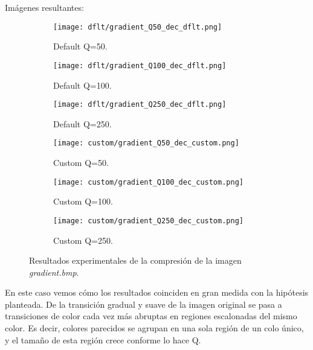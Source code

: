 \documentclass[12pt,a4paper]{article}
\begin{document}
Imágenes resultantes:
\begin{figure}[H]
    
    \begin{subfigure}{0.25\textwidth}
        \centering
        \texttt{[image: dflt/gradient\_Q50\_dec\_dflt.png]}
        \caption{Default Q=50.}
        
    \end{subfigure}
    \hfill
    \begin{subfigure}{0.25\textwidth}
        \centering
        \texttt{[image: dflt/gradient\_Q100\_dec\_dflt.png]}
        \caption{Default Q=100.}
        
    \end{subfigure}
    \hfill
    \begin{subfigure}{0.25\textwidth}
        \centering
        \texttt{[image: dflt/gradient\_Q250\_dec\_dflt.png]}
        \caption{Default Q=250.}
        
    \end{subfigure}
    
    \vspace{0.5cm}
    
    \begin{subfigure}{0.25\textwidth}
        \centering
        \texttt{[image: custom/gradient\_Q50\_dec\_custom.png]}
        \caption{Custom Q=50.}
        
    \end{subfigure}
    \hfill
    \begin{subfigure}{0.25\textwidth}
        \centering
        \texttt{[image: custom/gradient\_Q100\_dec\_custom.png]}
        \caption{Custom Q=100.}
        
    \end{subfigure}
    \hfill
    \begin{subfigure}{0.25\textwidth}
        \centering
        \texttt{[image: custom/gradient\_Q250\_dec\_custom.png]}
        \caption{Custom Q=250.}
        
    \end{subfigure}
    
    \caption[Resultados experimentales - gradient]{Resultados experimentales de la compresión de la imagen \textit{gradient.bmp}.}
    
\end{figure}

En este caso vemos cómo los resultados coinciden en gran medida con la hipótesis planteada. De la transición gradual y suave de la imagen original se pasa a transiciones de color cada vez más abruptas en regiones escalonadas del mismo color. Es decir, colores parecidos se agrupan en una sola región de un colo único, y el tamaño de esta región crece conforme lo hace Q.\\
\end{document}
